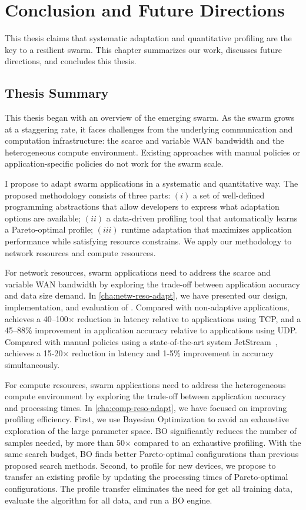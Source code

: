 \documentclass[thesis.tex]{subfiles}
\begin{document}
\chapter{Conclusion and Future Directions}
\label{cha:concl-future-work}

This thesis claims that systematic adaptation and quantitative profiling are the
key to a resilient swarm. This chapter summarizes our work, discusses future
directions, and concludes this thesis.

\section{Thesis Summary}
\label{sec:thesis-summary-1}

This thesis began with an overview of the emerging swarm. As the swarm grows at
a staggering rate, it faces challenges from the underlying communication and
computation infrastructure: the scarce and variable WAN bandwidth and the
heterogeneous compute environment. Existing approaches with manual policies or
application-specific policies do not work for the swarm scale.

I propose to adapt swarm applications in a systematic and quantitative way. The
proposed methodology consists of three parts: $(i)$ a set of well-defined
programming abstractions that allow developers to express what adaptation
options are available; $(ii)$ a data-driven profiling tool that automatically
learns a Pareto-optimal profile; $(iii)$ runtime adaptation that maximizes
application performance while satisfying resource constrains. We apply our
methodology to network resources and compute resources.

For network resources, swarm applications need to address the scarce and
variable WAN bandwidth by exploring the trade-off between application accuracy
and data size demand. In \autoref{cha:netw-reso-adapt}, we have presented our
design, implementation, and evaluation of \awstream{}. Compared with
non-adaptive applications, \awstream{} achieves a 40--100$\times$ reduction in
latency relative to applications using TCP, and a 45--88\% improvement in
application accuracy relative to applications using UDP. Compared with manual
policies using a state-of-the-art system JetStream~\cite{rabkin2014aggregation},
\awstream{} achieves a 15-20$\times$ reduction in latency and 1-5\% improvement
in accuracy simultaneously.

For compute resources, swarm applications need to address the heterogeneous
compute environment by exploring the trade-off between application accuracy and
processing times. In \autoref{cha:comp-reso-adapt}, we have focused on improving
profiling efficiency. First, we use Bayesian Optimization to avoid an exhaustive
exploration of the large parameter space. BO significantly reduces the number of
samples needed, by more than 50$\times$ compared to an exhaustive
profiling. With the same search budget, BO finds better Pareto-optimal
configurations than previous proposed search methods. Second, to profile for new
devices, we propose to transfer an existing profile by updating the processing
times of Pareto-optimal configurations. The profile transfer eliminates the need
for get all training data, evaluate the algorithm for all data, and run a BO
engine.
\end{document}
